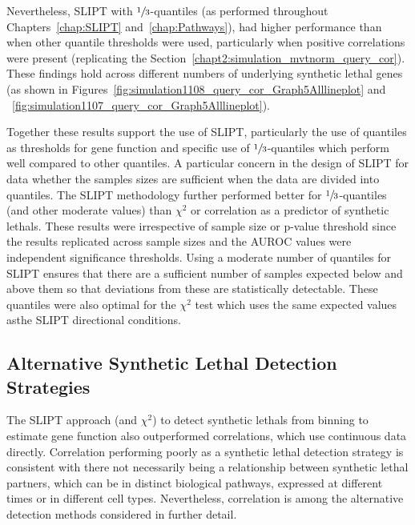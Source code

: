 Nevertheless, \gls{SLIPT} with $\sfrac{1}{3}$-quantiles (as performed throughout Chapters~\ref{chap:SLIPT} and~\ref{chap:Pathways}), had higher performance than  when other quantile thresholds were used, particularly when positive correlations were present (replicating the Section~\ref{chapt2:simulation_mvtnorm_query_cor}). These findings hold across different numbers of underlying \gls{synthetic lethal} genes (as shown in Figures~\ref{fig:simulation1108_query_cor_Graph5Alllineplot} and ~\ref{fig:simulation1107_query_cor_Graph5Alllineplot}).

Together these results support the use of \gls{SLIPT}, particularly the use of quantiles as thresholds for gene function and specific use of $\sfrac{1}{3}$-quantiles which perform well compared to other quantiles. A particular concern in the design of \gls{SLIPT} for  data whether the  samples sizes are sufficient when the data are divided into quantiles. The \gls{SLIPT} methodology further performed better for $\sfrac{1}{3}$-quantiles (and other moderate values) than $\chi^2$ or correlation as a predictor of \glspl{synthetic lethal}. These results were irrespective of sample size or p-value threshold since the results replicated across sample sizes and the \gls{AUROC} values were independent significance thresholds. Using a moderate number of quantiles for \gls{SLIPT} ensures that there are a sufficient number of samples expected below and above them so that deviations from these are statistically detectable. These quantiles were also optimal for the $\chi^2$ test which uses the same expected values asthe \gls{SLIPT} directional conditions.

\FloatBarrier

\subsection{Alternative Synthetic Lethal Detection Strategies}

The \gls{SLIPT} approach (and $\chi^2$) to detect \glspl{synthetic lethal} from binning  to estimate gene function also outperformed correlations, which use continuous data directly. Correlation performing poorly as a \gls{synthetic lethal} detection strategy is consistent with there not necessarily being a relationship between \gls{synthetic lethal} partners, which can be in distinct biological pathways, expressed at different times or in different cell types. Nevertheless, correlation is among the alternative detection methods considered in further detail.

